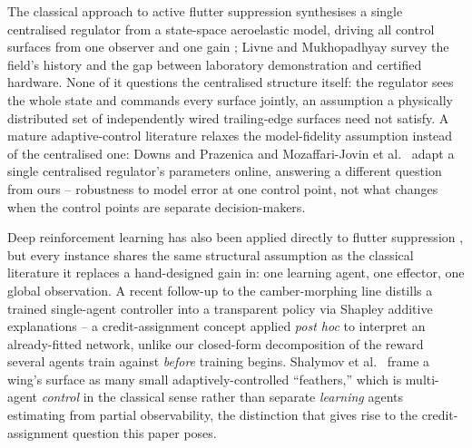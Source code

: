 \documentclass[preprint,11pt]{elsarticle}
\begin{document}
The classical approach to active flutter suppression synthesises a single
centralised regulator from a state-space aeroelastic model, driving all
control surfaces from one observer and one gain
\cite{karpel1982design,waszak2001robust,block1998applied}; Livne
\cite{livne2018flutter} and Mukhopadhyay \cite{mukhopadhyay2003historical}
survey the field's history and the gap between laboratory demonstration and
certified hardware. None of it questions the centralised structure itself:
the regulator sees the whole state and commands every surface jointly, an
assumption a physically distributed set of independently wired
trailing-edge surfaces need not satisfy. A mature adaptive-control
literature relaxes the model-fidelity assumption instead of the centralised
one: Downs and Prazenica \cite{downs2023adaptive} and Mozaffari-Jovin et
al.\ \cite{mozaffarijovin2024l1} adapt a single centralised regulator's
parameters online, answering a different question from ours -- robustness
to model error at one control point, not what changes when the control
points are separate decision-makers.

Deep reinforcement learning has also been applied directly to flutter
suppression \cite{stallflutter2025,circulation2023,flyingwing2022}, but
every instance shares the same structural assumption as the classical
literature it replaces a hand-designed gain in: one learning agent, one
effector, one global observation. A recent follow-up to the camber-morphing
line distills a trained single-agent controller into a transparent policy
via Shapley additive explanations \cite{shapley2026stallflutter} -- a
credit-assignment concept applied \emph{post hoc} to interpret an
already-fitted network, unlike our closed-form decomposition of the reward
several agents train against \emph{before} training begins. Shalymov et
al.\ \cite{shalymov2020feathers} frame a wing's surface as many small
adaptively-controlled ``feathers,'' which is multi-agent \emph{control} in
the classical sense rather than separate \emph{learning} agents estimating
from partial observability, the distinction that gives rise to the
credit-assignment question this paper poses.
\end{document}
